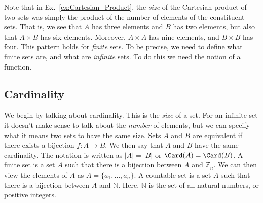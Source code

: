             Note that in Ex.~\ref{ex:Cartesian_Product}, the
            \textit{size} of the Cartesian product of two sets
            was simply the product of the number of elements of
            the constituent sets. That is, we see that $A$ has
            three elements and $B$ has two elements, but also
            that $A\times{B}$ has six elements. Moreover,
            $A\times{A}$ has nine elements, and $B\times{B}$ has
            four. This pattern holds for \textit{finite} sets.
            To be precise, we need to define what finite sets
            are, and what are \textit{infinite} sets. To do
            this we need the notion of a function.
    \subsection{Cardinality}
        We begin by talking about cardinality. This is the
        \textit{size} of a set. For an infinite set it
        doesn't make sense to talk about the \textit{number}
        of elements, but we can specify what it means two sets
        to have the same size. Sets $A$ and $B$ are equivalent
        if there exists a bijection $f:A\rightarrow{B}$.
        We then say that $A$ and $B$ have the same cardinality.
        The notation is written as $|A|=|B|$ or
        $\Card(A)=\Card(B)$. A finite set is a set $A$ such that
        there is a bijection between $A$ and $\mathbb{Z}_{n}$.
        We can then view the elements of $A$ as
        $A=\{a_{1},\hdots,a_{n}\}$. A countable set is a set
        $A$ such that there is a bijection between $A$ and
        $\mathbb{N}$. Here, $\mathbb{N}$ is the set of all
        natural numbers, or positive integers.
